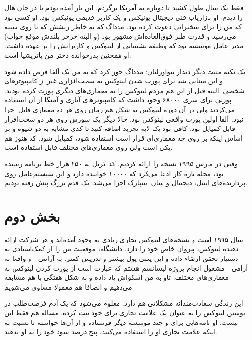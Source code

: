فقط یک سال طول کشید تا دوباره به آمریکا برگردم. این بار آمده بودم تا
در جان هال را دیدم. او بازاریاب فنی دیجیتال یونیکس و یک
کاربر قدیمی یونیکس بود. او کسی بود که من را برای سخنرانی دعوت کرده
بود. مدداگ که به خاطر ریشش که تا روی سینه می‌رسید و قدرت طنز
فوق‌العاده‌اش مشهور بود (و البته خرخر بلندش موقع خواب) مدیر عامل موسسه
 بود که وظیفه پشتیبانی از لینوکس و کاربرانش
را بر عهده داشت. او همچنین پدرخوانده دختر من پاتریشیا است.

یک نکته مثبت دیگر دیدار نیواورلئان: مدداگ جور کرد که به من یک آلفا قرض
داده شود و این مبنایی شد برای پورت شدن لینوکس به سخت‌افزاری غیر از
کامپیوترهای شخصی. البته قبل از این هم مردم لینوکس را به معماری‌های
دیگری پورت کرده بودند. پورتی برای سری ۶۸۰۰۰ وجود داشت که کامپیوترهای
آتاری و آمیگا از آن استفاده می‌کردند ولی در آن دوره لینوکس به شکل هم
زمان روی هر دو معماری قابل اجرا نبود. آلفا اولین پورت واقعی لینوکس
بود. حالا دیگر یک سورس روی هر دو سخت‌افزار قابل کمپایل بود. کافی بود یک
لایه تجرید اضافه کنید تا کدی مشابه به دو شیوه و بر اساس اینکه بر روی
چه معماری‌ای قرار است استفاده شود، کمپایل شود. کد هنوز هم یکی است ولی
روی معماری‌های مختلف قابل استفاده است.

وقتی در مارس ۱۹۹۵ نسخه  را ارائه کردیم، کد کرنل به ۲۵۰ هزار خط
برنامه رسیده بود، مجله تازه کار  ادعا می‌کرد که
۱۰۰۰۰ خواننده دارد و این سیستم‌عامل روی پردازنده‌های اینتل، دیجیتال و
سان اسپارک اجرا می‌شد. یک قدم بزرگ پیش رفته بودیم.

\section{بخش دوم}
سال ۱۹۹۵ است و نسخه‌های لینوکس تجاری زیادی به وجود آمده‌اند و هر شرکت
ارائه دهنده لینوکس، پیروان خاص خود را دارد. دانشگاه، موقعیت من را از
کمک‌استادی به دستیار تحقق ارتقاء داده و این یعنی پول بیشتر و تدریس
کمتر. به آرامی - و واقعا به آرامی - مشغول انجام پروژه لیسانسم هستم که
عبارت است از پورت کردن لینوکس به معماری‌های مختلف. تاو به من اسکواش یاد
داده و به شکل هفتگی با هم مسابقه می‌دهیم و انصافا هم معمولا مساوی
می‌شویم.

این زندگی سعادت‌مندانه مشکلاتی هم دارد. معلوم می‌شود که یک آدم فرصت‌طلب
در بوستن لینوکس را به عنوان یک علامت تجاری برای خود ثبت کرده. مساله هم
فقط این نیست. او نامه‌هایی برای  و چند موسسه
دیگر فرستاده و از آن‌ها خواسته تا  نسبت به اینکه
علامت تجاری او را استفاده می‌کنند، پنج درصد سود خود را به او بدهند.


